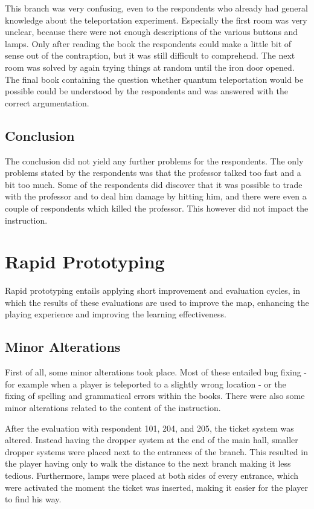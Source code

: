 \documentclass[11pt,twoside]{report} %
\begin{document}
This branch was very confusing, even to the respondents who already had general knowledge about the teleportation experiment. Especially the first room was very unclear, because there were not enough descriptions of the various buttons and lamps. Only after reading the book the respondents could make a little bit of sense out of the contraption, but it was still difficult to comprehend. The next room was solved by again trying things at random until the iron door opened. The final book containing the question whether quantum teleportation would be possible could be understood by the respondents and was answered with the correct argumentation.

\subsection{Conclusion}

The conclusion did not yield any further problems for the respondents. The only problems stated by the respondents was that the professor talked too fast and a bit too much. Some of the respondents did discover that it was possible to trade with the professor and to deal him damage by hitting him, and there were even a couple of respondents which killed the professor. This however did not impact the instruction.

\section{Rapid Prototyping}

Rapid prototyping entails applying short improvement and evaluation cycles, in which the results of these evaluations are used to improve the map, enhancing the playing experience and improving the learning effectiveness. %

\subsection{Minor Alterations}

First of all, some minor alterations took place. Most of these entailed bug fixing - for example when a player is teleported to a slightly wrong location - or the fixing of spelling and grammatical errors within the books. There were also some minor alterations related to the content of the instruction.

After the evaluation with respondent 101, 204, and 205, the ticket system was altered. Instead having the dropper system at the end of the main hall, smaller dropper systems were placed next to the entrances of the branch. This resulted in the player having only to walk the distance to the next branch making it less tedious. Furthermore, lamps were placed at both sides of every entrance, which were activated the moment the ticket was inserted, making it easier for the player to find his way.
\end{document}
